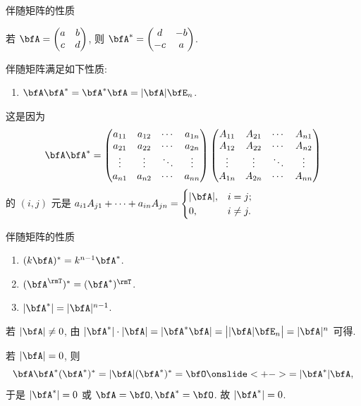 \begin{frame}{伴随矩阵的性质}
	\beqskip{3pt}
	\onslide<+->
	\begin{example}
		若 $\bfA=\begin{pmatrix}
			a&b\\c&d
		\end{pmatrix}$, 则 $\bfA^*=\begin{pmatrix}
			d&-b\\-c&a
		\end{pmatrix}$.
	\end{example}
	\onslide<+->
	伴随矩阵满足如下性质:
	\begin{enumerate}\bf
		\item \alert{$\bfA\bfA^*=\bfA^*\bfA=|\bfA|\bfE_n$.}
	\end{enumerate}
	\onslide<+->
	这是因为
	\[\bfA\bfA^*=\begin{pmatrix}
		a_{11}&a_{12}&\cdots &a_{1n}\\
		a_{21}&a_{22}&\cdots &a_{2n}\\
		\vdots&\vdots&\ddots&\vdots\\
		a_{n1}&a_{n2}&\cdots &a_{nn}
	\end{pmatrix}\begin{pmatrix}
		A_{11}&A_{21}&\cdots&A_{n1}\\
		A_{12}&A_{22}&\cdots&A_{n2}\\
		\vdots&\vdots&\ddots&\vdots\\
		A_{1n}&A_{2n}&\cdots&A_{nn}
	\end{pmatrix}\]
	\onslide<+->
	的 $(i,j)$ 元是
	$\displaystyle a_{i1}A_{j1}+\cdots+a_{in}A_{jn}=\begin{cases}
		|\bfA|,&i=j;\\
		0,&i\neq j.
	\end{cases}$
	\endgroup
\end{frame}


\begin{frame}{伴随矩阵的性质}
	\onslide<+->
	\begin{enumerate}\bf
		\setcounter{enumi}{1}
		\item $(k\bfA)^*=k^{n-1}\bfA^*$.
		\item $(\bfA^\rmT)^*=(\bfA^*)^\rmT$.
		\item \alert{$|\bfA^*|=|\bfA|^{n-1}$.}
	\end{enumerate}

	\onslide<+->
	若 $|\bfA|\neq0$, 由 $|\bfA^*|\cdot|\bfA|=|\bfA^*\bfA|=\bigl||\bfA|\bfE_n\bigr|=|\bfA|^n$ 可得.

	\onslide<+->
	若 $|\bfA|=0$, 则
	\[\bfA\bfA^*(\bfA^*)^*=|\bfA|(\bfA^*)^*=\bfO
	\onslide<+->{=|\bfA^*|\bfA,}\]
	\onslide<+->
	于是 $|\bfA^*|=0$ 或 $\bfA=\bfO,\bfA^*=\bfO$. 故 $|\bfA^*|=0$.
\end{frame}


